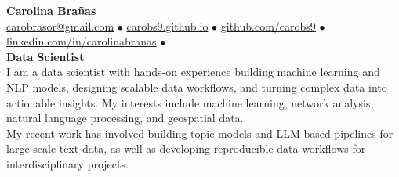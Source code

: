 \documentclass{resume}
\begin{document}
\vspace{-2em}
\begin{minipage}{0.75\textwidth}
    \raggedright
    {\Huge \textbf{Carolina Brañas}}\\[0.5em] 
    {\small
    \href{mailto://carobrasor@gmail.com}{carobrasor@gmail.com} $\bullet$ 
    \href{https://carobs9.github.io/}{carobs9.github.io} $\bullet$ 
    \href{https://github.com/carobs9}{github.com/carobs9} $\bullet$ 
    \href{https://www.linkedin.com/in/carolinabranas/}{linkedin.com/in/carolinabranas} $\bullet$ 
    }\\[1em]
    {\normalsize \textbf{Data Scientist}}\\[0.5em]
    I am a data scientist with hands-on experience building machine learning and NLP models, designing scalable data workflows, and turning complex data into actionable insights. 
    My interests include machine learning, network analysis, natural language processing, and geospatial data. \\
    My recent work has involved building topic models and LLM-based pipelines for large-scale text data, as well as developing reproducible data workflows for interdisciplinary projects. \\
\end{minipage}%
\hfill

\end{document}
